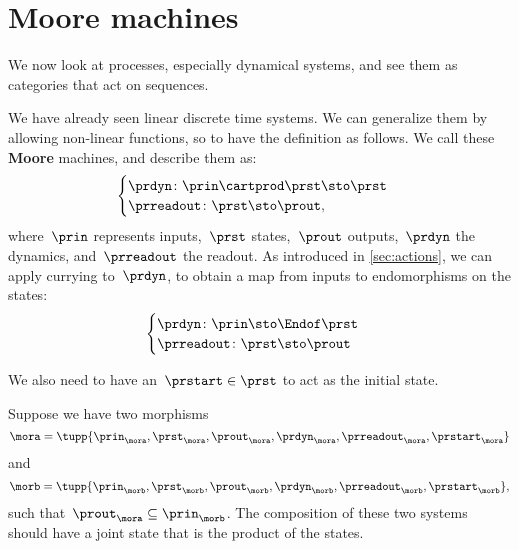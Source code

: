 

\section{Moore machines}
\label{sec:moore-machines}

We now look at processes, especially dynamical systems, and see them as categories that act on sequences.

We have already seen linear discrete time systems.
We can generalize them by allowing non-linear functions, so to have the definition as follows.
We call these \textbf{Moore} machines, and describe them as:
%
\begin{equation}
    \label{eq:moore-1}
    \begin{cases}
        \prdyn \colon \prin \cartprod \prst \sto \prst \\
        \prreadout \colon \prst \sto \prout,
    \end{cases}
\end{equation}
%
where~$\prin$ represents inputs,~$\prst$ states,~$\prout$ outputs,~$\prdyn$ the dynamics, and~$\prreadout$ the readout.
As introduced in \cref{sec:actions}, we can apply currying to~$\prdyn$, to obtain a map from inputs to endomorphisms on the states:
%
\begin{equation}
    \label{eq:moore-1-endo}
    \begin{cases}
        \prdyn \colon \prin \sto \Endof \prst \\
        \prreadout \colon \prst \sto \prout
    \end{cases}
\end{equation}
%

We also need to have an~$\prstart \in \prst$ to act as the initial state.

Suppose we have two morphisms
%
\begin{equation}
    \label{eq:moore-mora}
    \mora = \tupp{\prin_{\mora},\prst_{\mora},\prout_{\mora},\prdyn_{\mora},\prreadout_{\mora},\prstart_{\mora}}
\end{equation}
%
and
%
\begin{equation}
    \label{eq:moore-morb}
    \morb = \tupp{\prin_{\morb},\prst_{\morb},\prout_{\morb},\prdyn_{\morb},\prreadout_{\morb},\prstart_{\morb}},
\end{equation}
such that~$\prout_{\mora} \subseteq \prin_{\morb}$.
The composition of these two systems should have a joint state that is the product of the states.

